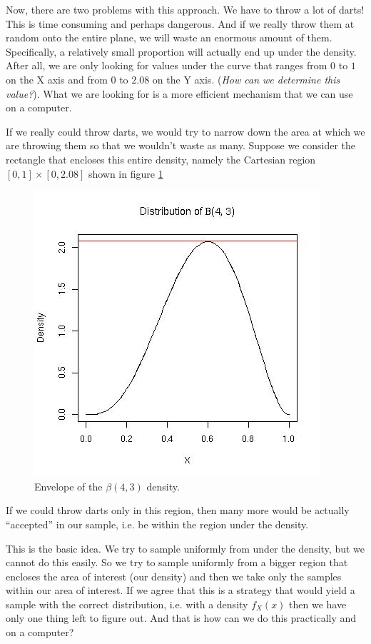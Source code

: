 \documentclass{article}
\def\question#1{\textit{#1}}
\begin{document}
Now, there are two problems with this approach.  We have to throw a
lot of darts!  This is time consuming and perhaps dangerous.  And if
we really throw them at random onto the entire plane, we will waste an
enormous amount of them.  Specifically, a relatively small proportion
will actually end up under the density.  After all, we are only
looking for values under the curve that ranges from $0$ to $1$ on the
X axis and from $0$ to $2.08$ on the Y axis. (\question{How can we
  determine this value?}).  What we are looking for is a more
efficient mechanism that we can use on a computer.

If we really could throw darts, we would try to narrow down the area
at which we are throwing them so that we wouldn't waste as many.
Suppose we consider the rectangle that encloses this entire density,
namely the Cartesian region $[0,1] \times [0, 2.08]$
shown in figure \ref{fig:beta43Unif}
\begin{figure}[htbp]
  \begin{center}
    \leavevmode
    \includegraphics{beta43Unif.jpg}
    \caption{Envelope of the $\beta(4, 3)$ density.}
    \label{fig:beta43Unif}
  \end{center}
\end{figure}
If we could throw darts only in this region, then many more would be
actually ``accepted'' in our sample, i.e. be within the region under
the density.

This is the basic idea.  We try to sample uniformly from under the
density, but we cannot do this easily.  So we try to sample uniformly
from a bigger region that encloses the area of interest (our density)
and then we take only the samples within our area of interest.  If we
agree that this is a strategy that would yield a sample with the
correct distribution, i.e. with a density $f_X(x)$ then we have only
one thing left to figure out.  And that is how can we do this
practically and on a computer?
\end{document}
